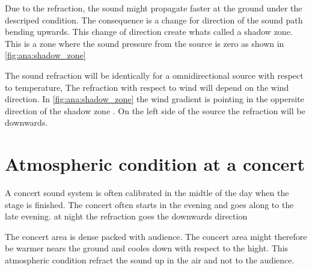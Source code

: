 
Due to the refraction, the sound might propagate faster at the ground under the descriped condition. The consequence is a change for direction of the sound path bending upwards. This change of direction create whats called a shadow zone. This is a zone where the sound pressure from the source is zero as shown in \autoref{fig:ana:shadow_zone}




The sound refraction will be identically for a omnidirectional source with respect to temperature, The refraction with respect to wind will depend on the wind direction. In \autoref{fig:ana:shadow_zone} the wind gradient is pointing in the oppersite direction of the shadow zone \citep{asmos_acous_2016}. On the left side of the source the refraction will be downwards.



 \section{Atmospheric condition at a concert}
A concert sound system is often calibrated in the midtle of the day when the stage is finished. The concert often starts in the evening and goes along to the late evening. at night the refraction goes the downwards direction 

The concert area is dense packed with audience. The concert area might therefore be warmer nears the ground and cooles down with respect to the hight. This atmospheric condition refract the sound up in the air and not to the audience. 















